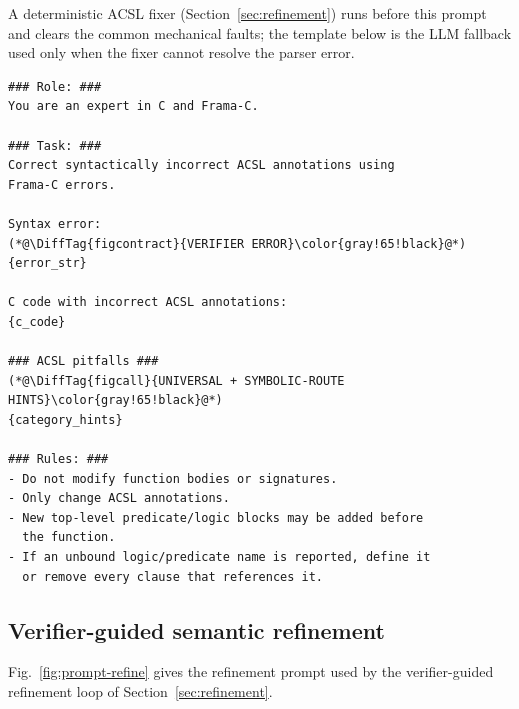
A deterministic ACSL fixer (Section~\ref{sec:refinement}) runs before this prompt and clears the common mechanical faults; the template below is the LLM fallback used only when the fixer cannot resolve the parser error.

\begin{tcolorbox}[promptboxcompact, title={Syntax-repair prompt}]
\begin{lstlisting}[style=PromptInnerCompact]
### Role: ###
You are an expert in C and Frama-C.

### Task: ###
Correct syntactically incorrect ACSL annotations using
Frama-C errors.

Syntax error:
(*@\DiffTag{figcontract}{VERIFIER ERROR}\color{gray!65!black}@*)
{error_str}

C code with incorrect ACSL annotations:
{c_code}

### ACSL pitfalls ###
(*@\DiffTag{figcall}{UNIVERSAL + SYMBOLIC-ROUTE HINTS}\color{gray!65!black}@*)
{category_hints}

### Rules: ###
- Do not modify function bodies or signatures.
- Only change ACSL annotations.
- New top-level predicate/logic blocks may be added before
  the function.
- If an unbound logic/predicate name is reported, define it
  or remove every clause that references it.
\end{lstlisting}
\end{tcolorbox}

\subsection{Verifier-guided semantic refinement}
\label{app:prompt-refine}

Fig.~\ref{fig:prompt-refine} gives the refinement prompt used by the verifier-guided refinement loop of Section~\ref{sec:refinement}.

